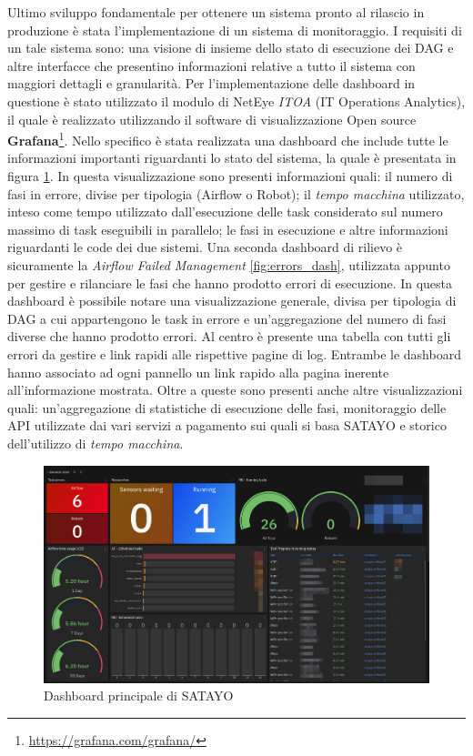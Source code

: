 Ultimo sviluppo fondamentale per ottenere un sistema pronto al rilascio in
produzione è stata l'implementazione di un sistema di monitoraggio. I requisiti di
un tale sistema sono: una visione di insieme dello stato di esecuzione dei DAG e
altre interfacce che presentino informazioni relative a tutto il sistema con
maggiori dettagli e granularità. Per l'implementazione delle dashboard in questione
è stato utilizzato il modulo di NetEye \textit{ITOA} (IT Operations Analytics), il
quale è realizzato utilizzando il software di visualizzazione Open source \textbf{Grafana}\footnote{\url{https://grafana.com/grafana/}}.
Nello specifico è stata realizzata una dashboard che include tutte le
informazioni importanti riguardanti lo stato del sistema, la quale è presentata in
figura \ref{fig:main_dash}. In questa visualizzazione sono presenti informazioni
quali: il numero di fasi in errore, divise per tipologia (Airflow o Robot); il \textit{tempo
macchina} utilizzato, inteso come tempo utilizzato dall'esecuzione delle task considerato
sul numero massimo di task eseguibili in parallelo; le fasi in esecuzione e
altre informazioni riguardanti le code dei due sistemi. Una seconda dashboard di
rilievo è sicuramente la \textit{Airflow Failed Management}
\ref{fig:errors_dash}, utilizzata appunto per gestire e rilanciare le fasi che hanno
prodotto errori di esecuzione. In questa dashboard è possibile notare una
visualizzazione generale, divisa per tipologia di DAG a cui appartengono le task
in errore e un'aggregazione del numero di fasi diverse che hanno prodotto errori.
Al centro è presente una tabella con tutti gli errori da gestire e link rapidi
alle rispettive pagine di log. Entrambe le dashboard hanno associato ad ogni pannello
un link rapido alla pagina inerente all'informazione mostrata. Oltre a queste
sono presenti anche altre visualizzazioni quali: un'aggregazione di statistiche di
esecuzione delle fasi, monitoraggio delle API utilizzate dai vari servizi a
pagamento sui quali si basa SATAYO e storico dell'utilizzo di \textit{tempo
macchina}.

\begin{figure}[htbp]
  \centering
  \includegraphics[width=.9\linewidth]{images/SATAYO_main_dashboard.png}
  \caption{Dashboard principale di SATAYO}
  \label{fig:main_dash}
\end{figure}

